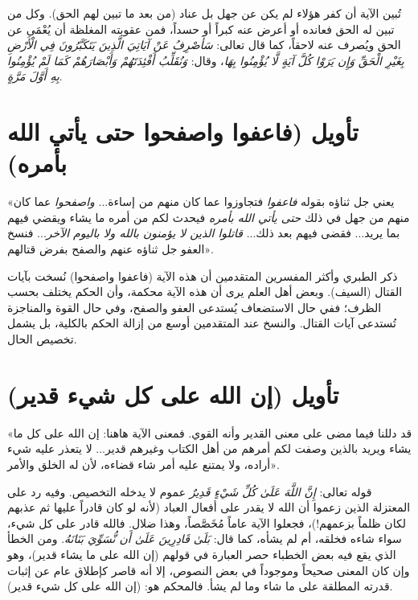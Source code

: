 \begin{fawaid}
تُبين الآية أن كفر هؤلاء لم يكن عن جهل بل عناد (من بعد ما تبين لهم الحق). وكل من تبين له الحق فعانده أو أعرض عنه كبراً أو حسداً، فمن عقوبته المغلظة أن يُعْمَى عن الحق ويُصرف عنه لاحقاً، كما قال تعالى: \textit{سَأَصْرِفُ عَنْ آيَاتِيَ الَّذِينَ يَتَكَبَّرُونَ فِي الْأَرْضِ بِغَيْرِ الْحَقِّ وَإِن يَرَوْا كُلَّ آيَةٍ لَّا يُؤْمِنُوا بِهَا}، وقال: \textit{وَنُقَلِّبُ أَفْئِدَتَهُمْ وَأَبْصَارَهُمْ كَمَا لَمْ يُؤْمِنُوا بِهِ أَوَّلَ مَرَّةٍ}.
\end{fawaid}

\separator

\section{تأويل (فاعفوا واصفحوا حتى يأتي الله بأمره)}
 «يعني جل ثناؤه بقوله \textit{فاعفوا} فتجاوزوا عما كان منهم من إساءة... \textit{واصفحوا} عما كان منهم من جهل في ذلك \textit{حتى يأتي الله بأمره} فيحدث لكم من أمره ما يشاء ويقضي فيهم بما يريد... فقضى فيهم بعد ذلك... \textit{قاتلوا الذين لا يؤمنون بالله ولا باليوم الآخر}... فنسخ العفو جل ثناؤه عنهم والصفح بفرض قتالهم».

\begin{fawaid}
ذكر الطبري وأكثر المفسرين المتقدمين أن هذه الآية (فاعفوا واصفحوا) نُسخت بآيات القتال (السيف). وبعض أهل العلم يرى أن هذه الآية محكمة، وأن الحكم يختلف بحسب الظرف؛ ففي حال الاستضعاف يُستدعى العفو والصفح، وفي حال القوة والمناجزة تُستدعى آيات القتال. والنسخ عند المتقدمين أوسع من إزالة الحكم بالكلية، بل يشمل تخصيص الحال.
\end{fawaid}

\separator

\section{تأويل (إن الله على كل شيء قدير)}
 «قد دللنا فيما مضى على معنى القدير وأنه القوي. فمعنى الآية هاهنا: إن الله على كل ما يشاء ويريد بالذين وصفت لكم أمرهم من أهل الكتاب وغيرهم قدير... لا يتعذر عليه شيء أراده، ولا يمتنع عليه أمر شاء قضاءه، لأن له الخلق والأمر».

\begin{fawaid}
قوله تعالى: \textit{إِنَّ اللَّهَ عَلَىٰ كُلِّ شَيْءٍ قَدِيرٌ} عموم لا يدخله التخصيص. وفيه رد على المعتزلة الذين زعموا أن الله لا يقدر على أفعال العباد (لأنه لو كان قادراً عليها ثم عذبهم لكان ظلماً بزعمهم!)، فجعلوا الآية عاماً مُخَصَّصاً، وهذا ضلال. فالله قادر على كل شيء، سواء شاءه فخلقه، أم لم يشأه، كما قال: \textit{بَلَىٰ قَادِرِينَ عَلَىٰ أَن نُّسَوِّيَ بَنَانَهُ}. 
ومن الخطأ الذي يقع فيه بعض الخطباء حصر العبارة في قولهم (إن الله على ما يشاء قدير)، وهو وإن كان المعنى صحيحاً وموجوداً في بعض النصوص، إلا أنه قاصر كإطلاق عام عن إثبات قدرته المطلقة على ما شاء وما لم يشأ. فالمحكم هو: (إن الله على كل شيء قدير).
\end{fawaid}


